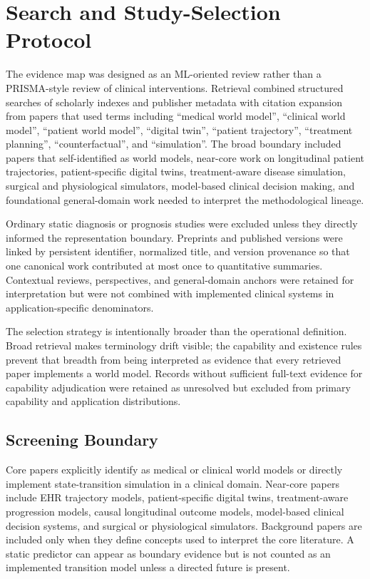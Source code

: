 \section{Search and Study-Selection Protocol}
\label{app:protocol}

The evidence map was designed as an ML-oriented review rather than a PRISMA-style review of clinical interventions. Retrieval combined structured searches of scholarly indexes and publisher metadata with citation expansion from papers that used terms including ``medical world model'', ``clinical world model'', ``patient world model'', ``digital twin'', ``patient trajectory'', ``treatment planning'', ``counterfactual'', and ``simulation''. The broad boundary included papers that self-identified as world models, near-core work on longitudinal patient trajectories, patient-specific digital twins, treatment-aware disease simulation, surgical and physiological simulators, model-based clinical decision making, and foundational general-domain work needed to interpret the methodological lineage.

Ordinary static diagnosis or prognosis studies were excluded unless they directly informed the representation boundary. Preprints and published versions were linked by persistent identifier, normalized title, and version provenance so that one canonical work contributed at most once to quantitative summaries. Contextual reviews, perspectives, and general-domain anchors were retained for interpretation but were not combined with implemented clinical systems in application-specific denominators.

The selection strategy is intentionally broader than the operational definition. Broad retrieval makes terminology drift visible; the capability and existence rules prevent that breadth from being interpreted as evidence that every retrieved paper implements a world model. Records without sufficient full-text evidence for capability adjudication were retained as unresolved but excluded from primary capability and application distributions.

\subsection{Screening Boundary}

Core papers explicitly identify as medical or clinical world models or directly implement state-transition simulation in a clinical domain. Near-core papers include EHR trajectory models, patient-specific digital twins, treatment-aware progression models, causal longitudinal outcome models, model-based clinical decision systems, and surgical or physiological simulators. Background papers are included only when they define concepts used to interpret the core literature. A static predictor can appear as boundary evidence but is not counted as an implemented transition model unless a directed future is present.


